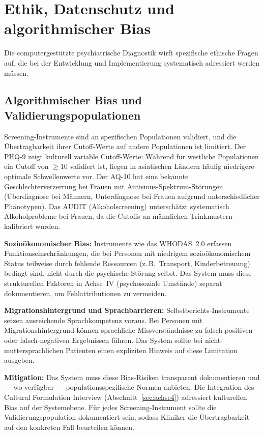 \documentclass[11pt,a4paper]{article}
\begin{document}
\section{Ethik, Datenschutz und algorithmischer Bias}
\label{sec:ethik}

Die computergest\"utzte psychiatrische Diagnostik wirft spezifische ethische Fragen auf, die bei der Entwicklung und Implementierung systematisch adressiert werden m\"ussen.

\subsection{Algorithmischer Bias und Validierungspopulationen}

Screening-Instrumente sind an spezifischen Populationen validiert, und die \"Ubertragbarkeit ihrer Cutoff-Werte auf andere Populationen ist limitiert. Der PHQ-9 zeigt kulturell variable Cutoff-Werte: W\"ahrend f\"ur westliche Populationen ein Cutoff von $\geq 10$ validiert ist, liegen in asiatischen L\"andern h\"aufig niedrigere optimale Schwellenwerte vor. Der AQ-10 hat eine bekannte Geschlechterverzerrung bei Frauen mit Autismus-Spektrum-St\"orungen (\"Uberdiagnose bei M\"annern, Unterdiagnose bei Frauen aufgrund unterschiedlicher Ph\"anotypen). Das AUDIT (Alkoholscreening) untersch\"atzt systematisch Alkoholprobleme bei Frauen, da die Cutoffs an m\"annlichen Trinkmustern kalibriert wurden.

\textbf{Sozio\"okonomischer Bias:} Instrumente wie das WHODAS~2.0 erfassen Funktionseinschr\"ankungen, die bei Personen mit niedrigem sozio\"okonomischem Status teilweise durch fehlende Ressourcen (z.\,B.\ Transport, Kinderbetreuung) bedingt sind, nicht durch die psychische St\"orung selbst. Das System muss diese strukturellen Faktoren in Achse~IV (psychosoziale Umst\"ande) separat dokumentieren, um Fehlattributionen zu vermeiden.

\textbf{Migrationshintergrund und Sprachbarrieren:} Selbstberichts-Instrumente setzen ausreichende Sprachkompetenz voraus. Bei Personen mit Migrationshintergrund k\"onnen sprachliche Missverst\"andnisse zu falsch-positiven oder falsch-negativen Ergebnissen f\"uhren. Das System sollte bei nicht-muttersprachlichen Patienten einen expliziten Hinweis auf diese Limitation ausgeben.

\textbf{Mitigation:} Das System muss diese Bias-Risiken transparent dokumentieren und --- wo verf\"ugbar --- populationsspezifische Normen anbieten. Die Integration des Cultural Formulation Interview (Abschnitt~\ref{sec:achse4}) adressiert kulturellen Bias auf der Systemebene. F\"ur jedes Screening-Instrument sollte die Validierungspopulation dokumentiert sein, sodass Kliniker die \"Ubertragbarkeit auf den konkreten Fall beurteilen k\"onnen.
\end{document}
